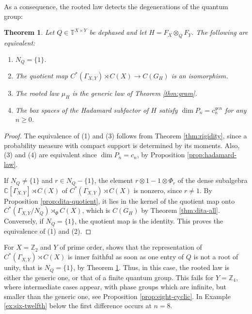 \documentclass[11pt,reqno]{amsart}
\newtheorem{thm}{Theorem}[section]
\theoremstyle{definition}
\numberwithin{equation}{section}
\begin{document}
As a consequence, the rooted law detects the degenerations of the quantum group:

\begin{thm}\label{thm:degenerate}
Let $Q\in\mathbb T^{X\times Y}$ be dephased and let $H=F_X\otimes_QF_Y$. The following are equivalent:
\begin{enumerate}
\item $N_Q=\{1\}$.
\item The quotient map $C^*(\Gamma_{X,Y})\rtimes C(X)\to C(G_H)$ is an isomorphism.
\item The rooted law $\mu_H$ is the generic law of Theorem \ref{thm:gram}.
\item The box spaces of the Hadamard subfactor of $H$ satisfy $\dim P_n=c_n^{gen}$ for any $n\geq0$.
\end{enumerate}
\end{thm}

\begin{proof}
The equivalence of (1) and (3) follows from Theorem \ref{thm:rigidity}, since a probability measure with compact support is determined by its moments. Also, (3) and (4) are equivalent since $\dim P_n=c_n$, by Proposition \ref{prop:hadamard-law}.

If $N_Q\neq\{1\}$ and $r\in N_Q-\{1\}$, the element $r\otimes1-1\otimes\Phi_r$ of the dense subalgebra $\mathbb C[\Gamma_{X,Y}]\rtimes C(X)$ of $C^*(\Gamma_{X,Y})\rtimes C(X)$ is nonzero, since $r\neq1$. By Proposition \ref{prop:dita-quotient}, it lies in the kernel of the quotient map onto $C^*(\Gamma_{X,Y}/N_Q)\rtimes_\Phi C(X)$, which is $C(G_H)$ by Theorem \ref{thm:dita-all}. Conversely, if $N_Q=\{1\}$, the quotient map is the identity. This proves the equivalence of (1) and (2).
\end{proof}

For $X=\mathbb Z_2$ and $Y$ of prime order, \cite[Theorem 5.1]{Bic15} shows that the representation of $C^*(\Gamma_{X,Y})\rtimes C(X)$ is inner faithful as soon as one entry of $Q$ is not a root of unity, that is $N_Q=\{1\}$, by Theorem \ref{thm:degenerate}. Thus, in this case, the rooted law is either the generic one, or that of a finite quantum group. This fails for $Y=\mathbb Z_4$, where intermediate cases appear, with phase groups which are infinite, but smaller than the generic one, see Proposition \ref{prop:eight-cyclic}. In Example \ref{ex:six-twelfth} below the first difference occurs at $n=8$.
\end{document}
